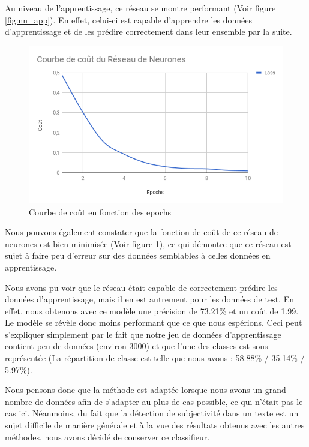 \par Au niveau de l'apprentissage, ce réseau se montre performant (Voir figure \ref{fig:nn_app}). En effet, celui-ci est capable d'apprendre les données d'apprentissage et de les prédire correctement dans leur ensemble par la suite.

\begin{figure}
	\centering
	\includegraphics[scale=0.75]{./img/loss_nn_chart.png}
	\caption{Courbe de coût en fonction des epochs}
	\label{fig:nn_loss}
\end{figure}

\par Nous pouvons également constater que la fonction de coût de ce réseau de neurones est bien minimisée (Voir figure \ref{fig:nn_loss}), ce qui démontre que ce réseau est sujet à faire peu d'erreur sur des données semblables à celles données en apprentissage.

\par Nous avons pu voir que le réseau était capable de correctement prédire les données d'apprentissage, mais il en est autrement pour les données de test. En effet, nous obtenons avec ce modèle une précision de 73.21\% et un coût de 1.99. Le modèle se révèle donc moins performant que ce que nous espérions. Ceci peut s'expliquer simplement par le fait que notre jeu de données d'apprentissage contient peu de données (environ 3000) et que l'une des classes est sous-représentée (La répartition de classe est telle que nous avons : 58.88\% / 35.14\% / 5.97\%).

\par Nous pensons donc que la méthode est adaptée lorsque nous avons un grand nombre de données afin de s'adapter au plus de cas possible, ce qui n'était pas le cas ici. Néanmoins, du fait que la détection de subjectivité dans un texte est un sujet difficile de manière générale et à la vue des résultats obtenus avec les autres méthodes, nous avons décidé de conserver ce classifieur.

